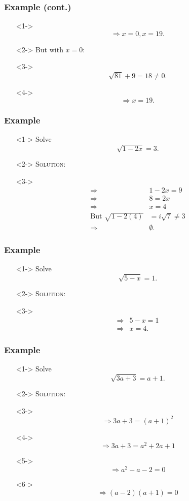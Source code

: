 \documentclass[handout]{beamer}
\begin{document}
\begin{frame}
	\frametitle{Example (cont.)}
	\begin{enumerate}
		\item[]<1-> \[ \Rightarrow x=0, x=19. \]
		\item[]<2-> But with $x=0$:
		\item[]<3->
		\[
			\sqrt{81}+9=18 \neq 0.
		\]
		\item[]<4->
		\[
			\Rightarrow x=19.
		\]
	\end{enumerate}
\end{frame}

\begin{frame}
	\frametitle{Example}
	\begin{enumerate}
		\item[]<1-> Solve
		\[
			\sqrt{1-2x}=3.
		\]
		\item[]<2-> \textsc{Solution:}
		\item[]<3->
			\begin{align*}
				\Rightarrow & 1-2x=9 \\
				\Rightarrow & 8=2x \\
				\Rightarrow & x=4 \\
				\text{But } \sqrt{1-2(4)}&=i\sqrt{7} \neq 3 \\
				\Rightarrow & \emptyset.
			\end{align*}
	\end{enumerate}
\end{frame}

\begin{frame}
	\frametitle{Example}
	\begin{enumerate}
		\item[]<1-> Solve
		\[
			\sqrt{5-x}=1.
		\]
		\item[]<2-> \textsc{Solution:}
		\item[]<3->
			\begin{align*}
				\Rightarrow & 5-x=1 \\
				\Rightarrow & x=4.
			\end{align*}
	\end{enumerate}
\end{frame}

\begin{frame}
	\frametitle{Example}
	\begin{enumerate}
		\item[]<1-> Solve
		\[
			\sqrt{3a+3}=a+1.
		\]
		\item[]<2-> \textsc{Solution:}
		\item[]<3-> \[ \Rightarrow 3a+3=(a+1)^{2} \]
		\item[]<4-> \[ \Rightarrow 3a+3=a^{2}+2a+1 \]
		\item[]<5-> \[ \Rightarrow a^{2}-a-2=0 \]
		\item[]<6-> \[ \Rightarrow (a-2)(a+1)=0 \]
	\end{enumerate}
\end{frame}
\end{document}

